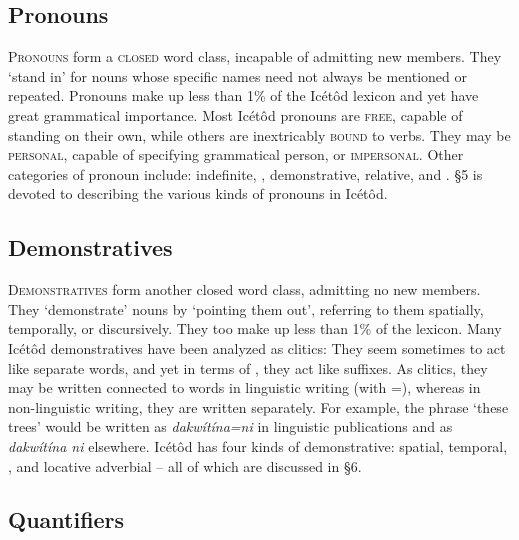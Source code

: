\subsection{Pronouns}\label{sec:3.3}


\textsc{Pronouns} form a \textsc{closed} word class, incapable of admitting new members. They ‘stand in’ for nouns whose specific names need not always be mentioned or repeated. Pronouns make up less than 1\% of the Icétôd lexicon and yet have great grammatical importance. Most Icétôd pronouns are \textsc{free}, capable of standing on their own, while others are inextricably \textsc{bound} to verbs. They may be \textsc{personal}, capable of specifying grammatical person, or \textsc{impersonal}. Other categories of pronoun include: indefinite, , demonstrative, relative, and . §5 is devoted to describing the various kinds of pronouns in Icétôd.
 
\subsection{Demonstratives}\label{sec:3.4}


\textsc{Demonstratives} form another closed word class, admitting no new members. They ‘demonstrate’ nouns by ‘pointing them out’, referring to them spatially, temporally, or discursively. They too make up less than 1\% of the lexicon. Many Icétôd demonstratives have been analyzed as clitics: They seem sometimes to act like separate words, and yet in terms of , they act like suffixes. As clitics, they may be written connected to words in linguistic writing (with =), whereas in non-linguistic writing, they are written separately. For example, the phrase ‘these trees’ would be written as \textit{dakwítína=ni} in linguistic publications and as \textit{dakwítína ni} elsewhere. Icétôd has four kinds of demonstrative: spatial, temporal, , and locative adverbial – all of which are discussed in §6.
 
\subsection{Quantifiers}\label{sec:3.5}


